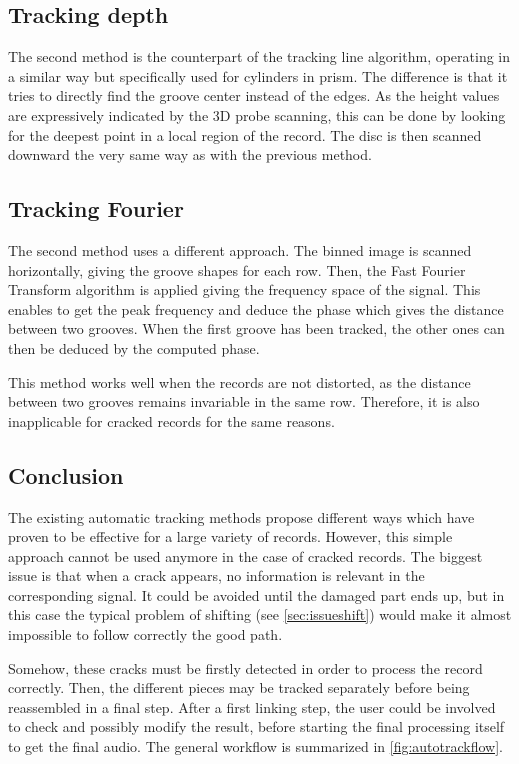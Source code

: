 \subsection{Tracking depth}

The second method is the counterpart of the tracking line algorithm, operating in a similar way but specifically used for cylinders in \gls{prism}. The difference is that it tries to directly find the groove center instead of the edges. As the height values are expressively indicated by the 3D probe scanning, this can be done by looking for the deepest point in a local region of the record. The disc is then scanned downward the very same way as with the previous method.

\subsection{Tracking Fourier}

The second method uses a different approach. The binned image is scanned horizontally, giving the groove shapes for each row. Then, the Fast Fourier Transform algorithm is applied giving the frequency space of the signal. This enables to get the peak frequency and deduce the phase which gives the distance between two grooves. When the first groove has been tracked, the other ones can then be deduced by the computed phase.

This method works well when the records are not distorted, as the distance between two grooves remains invariable in the same row. Therefore, it is also inapplicable for cracked records for the same reasons.

\subsection{Conclusion}

The existing automatic tracking methods propose different ways which have proven to be effective for a large variety of records. However, this simple approach cannot be used anymore in the case of cracked records. The biggest issue is that when a crack appears, no information is relevant in the corresponding signal. It could be avoided until the damaged part ends up, but in this case the typical problem of shifting (see \autoref{sec:issueshift}) would make it almost impossible to follow correctly the good path.

Somehow, these cracks must be firstly detected in order to process the record correctly. Then, the different pieces may be tracked separately before being reassembled in a final step. After a first linking step, the user could be involved to check and possibly modify the result, before starting the final processing itself to get the final audio. The general workflow is summarized in \autoref{fig:autotrackflow}.

